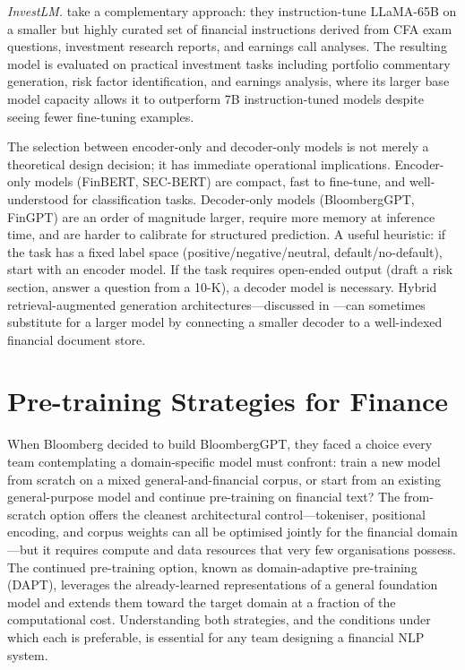 \textit{InvestLM.}  \citet{yang2023investlm} take a complementary approach:
they instruction-tune LLaMA-65B on a smaller but highly curated set of financial
instructions derived from CFA exam questions, investment research reports, and
earnings call analyses.  The resulting model is evaluated on practical investment
tasks including portfolio commentary generation, risk factor identification, and
earnings analysis, where its larger base model capacity allows it to outperform
7B instruction-tuned models despite seeing fewer fine-tuning examples.

\begin{remark}
The selection between encoder-only and decoder-only models is not merely a
theoretical design decision; it has immediate operational implications.
Encoder-only models (FinBERT, SEC-BERT) are compact, fast to fine-tune, and
well-understood for classification tasks.  Decoder-only models (BloombergGPT,
FinGPT) are an order of magnitude larger, require more memory at inference time,
and are harder to calibrate for structured prediction.  A useful heuristic: if
the task has a fixed label space (positive/negative/neutral, default/no-default),
start with an encoder model.  If the task requires open-ended output
(draft a risk section, answer a question from a 10-K), a decoder model is necessary.
Hybrid retrieval-augmented generation architectures---discussed in
---can sometimes substitute for a larger model by
connecting a smaller decoder to a well-indexed financial document store.
\end{remark}

\section{Pre-training Strategies for Finance}
\label{sec:ch08-pretraining-strategies}

\begin{context}
When Bloomberg decided to build BloombergGPT, they faced a choice every
team contemplating a domain-specific model must confront: train a new model
from scratch on a mixed general-and-financial corpus, or start from an existing
general-purpose model and continue pre-training on financial text?  The from-scratch
option offers the cleanest architectural control---tokeniser, positional encoding,
and corpus weights can all be optimised jointly for the financial domain---but it
requires compute and data resources that very few organisations possess.  The
continued pre-training option, known as domain-adaptive pre-training (DAPT),
leverages the already-learned representations of a general foundation model and
extends them toward the target domain at a fraction of the computational cost.
Understanding both strategies, and the conditions under which each is preferable,
is essential for any team designing a financial NLP system.
\end{context}

